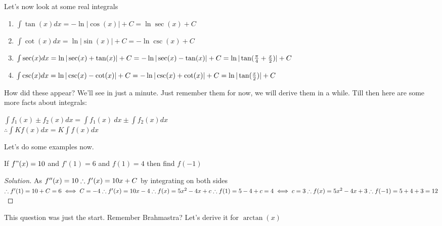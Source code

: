 Let's now look at some real integrals\\
\begin{theorem}
    \begin{enumerate}
        \item $\int \tan(x) dx = -\ln{|\cos(x)|} +C = \ln{\sec(x)}+C$
        \item $\int \cot(x) dx = \ln{|\sin(x)|} +C = -\ln{\csc(x)}+C$
        \item $\int \sec(x) dx = \ln{|\sec(x)+\tan(x)|} +C 
        \\= -\ln{|\sec(x)-\tan(x)|}+C
        \\=\ln{|\tan(\frac{\pi}{4}+\frac{x}{2})|}+C$
        \item $\int \csc(x) dx = \ln{|\csc(x)-\cot(x)|} +C
        \\= -\ln{|\csc(x)+\cot(x)|}+C
        \\=\ln{|\tan(\frac{x}{2})|}+C$
    \end{enumerate}
\end{theorem}
How did these appear? We'll see in just a minute. Just remember them for now, we will derive them in a while. Till then here are some more facts about integrals:\\
\begin{theorem}
    $\int f_1(x) \pm f_2(x) dx = \int f_1(x)\ dx \pm \int f_2(x) dx$ \\
    $\therefore \int Kf(x)dx = K \int f(x)dx$
\end{theorem}
Let's do some examples now.\\
\begin{example}
    If $f"(x) = 10$ and $f’(1) = 6$ and $f(1) = 4$ then find $f(-1)$    
\end{example}
\begin{proof}
[Solution]
    As $f''(x)=10\\
    \therefore f'(x)=10x+C$ by integrating on both sides\\
    $\therefore f'(1)=10+C=6 \iff C=-4\\
    \therefore f'(x)=10x-4\\
    \therefore f(x)=5x^2-4x+c\\
    \therefore f(1)=5-4+c=4 \iff c=3\\
    \therefore f(x)=5x^2-4x+3\\
    \therefore f(-1)=5+4+3=12$
\end{proof}
This question was just the start. Remember Brahmastra? Let's derive it for $\arctan(x)$\\
